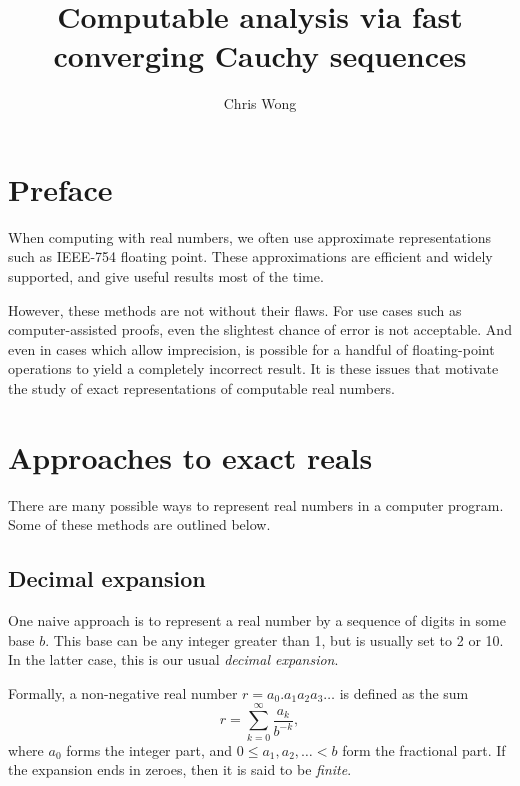 \documentclass[leqno]{report}
\begin{document}
\author{Chris Wong}
\title{Computable analysis via fast converging Cauchy sequences}
\maketitle

\chapter*{Preface}

When computing with real numbers, we often use approximate representations such as IEEE-754 floating point. These approximations are efficient and widely supported, and give useful results most of the time.

However, these methods are not without their flaws. For use cases such as computer-assisted proofs, even the slightest chance of error is not acceptable. And even in cases which allow imprecision, is possible for a handful of floating-point operations to yield a completely incorrect result. It is these issues that motivate the study of exact representations of computable real numbers.



\chapter{Approaches to exact reals}

There are many possible ways to represent real numbers in a computer program. Some of these methods are outlined below.

\section{Decimal expansion}

One naive approach is to represent a real number by a sequence of digits in some base $b$. This base can be any integer greater than 1, but is usually set to 2 or 10. In the latter case, this is our usual \textit{decimal expansion}.

Formally, a non-negative real number $r = a_0 . a_1 a_2 a_3 \ldots$ is defined as the sum
\[
    r = \sum_{k=0}^\infty \frac{a_k}{b^{-k}},
\]
where $a_0$ forms the integer part, and $0 \leq a_1, a_2, \ldots < b$ form the fractional part. If the expansion ends in zeroes, then it is said to be \textit{finite}.
\end{document}
